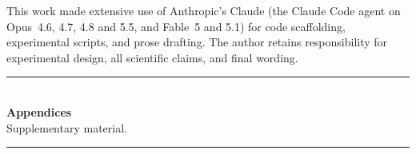 \documentclass{article}
\begin{document}
\begin{ack}
This work made extensive use of Anthropic's Claude (the Claude Code agent on
Opus~4.6, 4.7, 4.8 and 5.5, and Fable~5 and 5.1) for code scaffolding, experimental scripts, and
prose drafting. The author retains responsibility for experimental design, all
scientific claims, and final wording.
\end{ack}



\appendix
\newpage
\begin{center}
  \rule{0.5\linewidth}{0.4pt}\\[0.6em]
  {\Large\bfseries Appendices}\\[0.25em]
  {\small Supplementary material.}\\[0.4em]
  \rule{0.5\linewidth}{0.4pt}
\end{center}
\vspace{0.5em}



\end{document}

